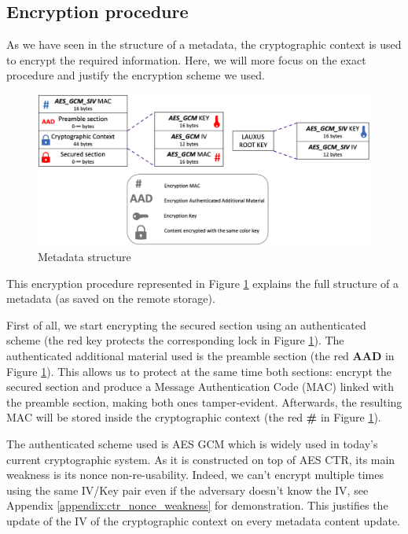 \documentclass[../main.tex]{subfiles}
\begin{document}
\subsection{Encryption procedure}
\label{section:lauxus:metadata_encryption}

\par As we have seen in the structure of a metadata, the cryptographic context is used to encrypt the required information. Here, we will more focus on the exact procedure and justify the encryption scheme we used.
\begin{figure}[h]
    \centering
    \includegraphics[width=\textwidth]{images/lauxus/metadata_encryption}
    
    \caption{Metadata structure}
    \label{figure:lauxus:metadata_encryption}
\end{figure}
\par This encryption procedure represented in Figure \ref{figure:lauxus:metadata_encryption} explains the full structure of a metadata (as saved on the remote storage).
\par First of all, we start encrypting the secured section using an authenticated scheme (the red key protects the corresponding lock in Figure \ref{figure:lauxus:metadata_encryption}). The authenticated additional material used is the preamble section (the red \textbf{AAD} in Figure \ref{figure:lauxus:metadata_encryption}). This allows us to protect at the same time both sections: encrypt the secured section and produce a Message Authentication Code (MAC) linked with the preamble section, making both ones tamper-evident. Afterwards, the resulting MAC will be stored inside the cryptographic context (the red \textbf{\#} in Figure \ref{figure:lauxus:metadata_encryption}).
\par The authenticated scheme used is AES GCM which is widely used in today's current cryptographic system. As it is constructed on top of AES CTR, its main weakness is its nonce non-re-usability. Indeed, we can't encrypt multiple times using the same IV/Key pair even if the adversary doesn't know the IV, see Appendix \ref{appendix:ctr_nonce_weakness} for demonstration. This justifies the update of the IV of the cryptographic context on every metadata content update.
\end{document}
